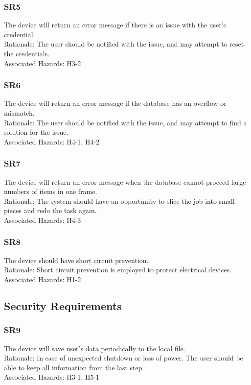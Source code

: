 \documentclass{article}
\begin{document}
\subsubsection{SR5}
The device will return an error message if there is an issue with the user’s credential.\\
Rationale: The user should be notified with the issue, and may attempt to reset the credentials.\\
Associated Hazards: H3-2
\subsubsection{SR6}
The device will return an error message if the database has an overflow or mismatch.\\
Rationale: The user should be notified with the issue, and may attempt to find a solution for the issue.\\
Associated Hazards: H4-1, H4-2
\subsubsection{SR7}
The device will return an error message when the database cannot proceed large numbers of items in one frame.\\
Rationale: The system should have an opportunity to slice the job into small pieces and redo the task again.\\
Associated Hazards: H4-3
\subsubsection{SR8}
The device should have short circuit prevention.\\
Rationale: Short circuit prevention is employed to protect electrical devices.\\
Associated Hazards: H1-2

\subsection{Security Requirements}
\subsubsection{SR9}
The device will save user’s data periodically to the local file.\\
Rationale: In case of unexpected shutdown or loss of power. The user should be able to keep all information from the last step.\\
Associated Hazards: H3-1, H5-1
\end{document}
